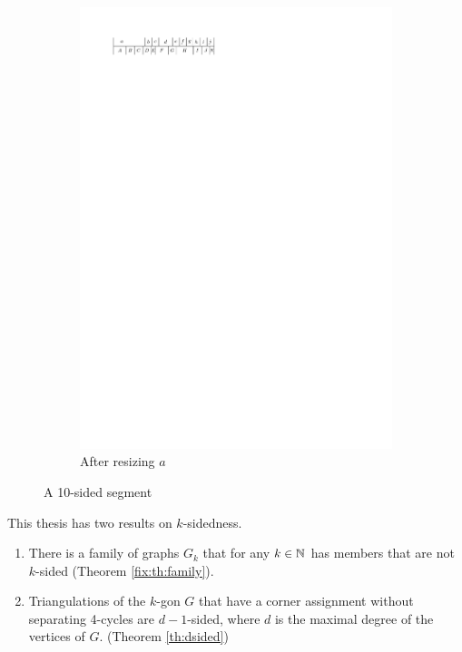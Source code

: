 \begin{figure}
    \begin{subfigure}[b]{0.45 \textwidth}
      \centering
      \includegraphics{introduction/img/10sidedAfter.pdf}
      \caption{After resizing $a$}
      \label{fig:intro:10sidedAfter}
    \end{subfigure}
    \caption{A 10-sided segment}
    \label{fig:intro:10sided}
  \end{figure}


  This thesis has two results on $k$-sidedness.
  \begin{enumerate}
    \item There is a family of graphs $G_k$ that for any $k \in \mathbb{N}$ has members that are not $k$-sided (Theorem \ref{fix:th:family}).
    \item Triangulations of the $k$-gon $G$ that have a corner assignment without separating 4-cycles are $d-1$-sided, where $d$ is the maximal degree of the vertices of $G$. (Theorem \ref{th:dsided})
  \end{enumerate}

